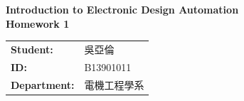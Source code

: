 \documentclass[12pt]{article}
\begin{document}
\thispagestyle{fancy}


\begin{center}
  {\large \bfseries Introduction to Electronic Design Automation} \\
  \vspace{1em}
  {\Large \bfseries Homework 1} \\
\end{center}

\vspace{2em}

\begin{tabular}{@{}l l}
  \textbf{Student:} & 吳亞倫 \\
  \textbf{ID:} & B13901011  \\
  \textbf{Department:} & 電機工程學系
\end{tabular}
\bigskip

\end{document}
